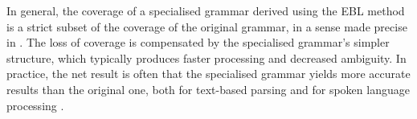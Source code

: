 \documentclass[11pt]{article}
\begin{document}
In general, the coverage of a specialised grammar derived using the
EBL method is a strict subset of the coverage of the original grammar,
in a sense made precise in \cite{RaynerCarterSamuelsson00}. The loss
of coverage is compensated by the specialised grammar's simpler
structure, which typically produces faster processing and decreased
ambiguity. In practice, the net result is often that the specialised
grammar yields more accurate results than the original one,
both for text-based parsing \cite{SamuelssonRayner91,Samuelsson94}
and for spoken language processing \cite{RaynerHockeyDowding2002}.

%
%
%
\end{document}
